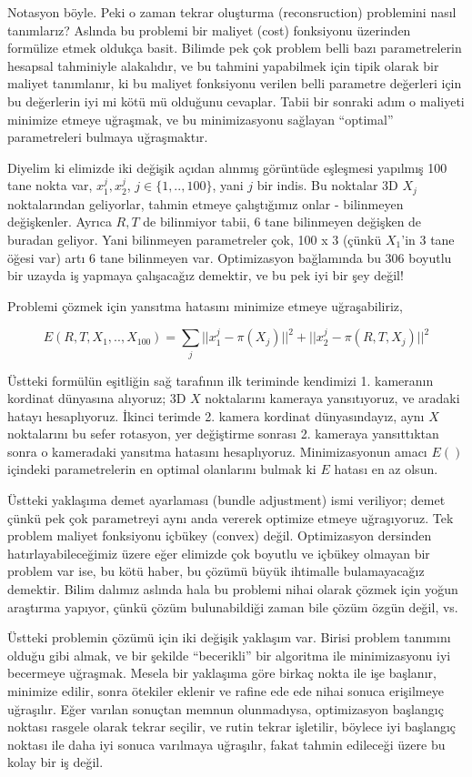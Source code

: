 \documentclass[12pt,fleqn]{article}\usepackage{../../common}
\begin{document}
Notasyon böyle. Peki o zaman tekrar oluşturma (reconsruction) problemini nasıl
tanımlarız? Aslında bu problemi bir maliyet (cost) fonksiyonu üzerinden
formülize etmek oldukça basit. Bilimde pek çok problem belli bazı parametrelerin
hesapsal tahminiyle alakalıdır, ve bu tahmini yapabilmek için tipik olarak bir
maliyet tanımlanır, ki bu maliyet fonksiyonu verilen belli parametre değerleri
için bu değerlerin iyi mi kötü mü olduğunu cevaplar. Tabii bir sonraki adım o
maliyeti minimize etmeye uğraşmak, ve bu minimizasyonu sağlayan ``optimal''
parametreleri bulmaya uğraşmaktır.

Diyelim ki elimizde iki değişik açıdan alınmış görüntüde eşleşmesi yapılmış 100
tane nokta var, $x_1^j,x_2^j$, $j \in \{1,..,100\}$, yani $j$ bir indis. Bu
noktalar 3D $X_j$ noktalarından geliyorlar, tahmin etmeye çalıştığımız onlar -
bilinmeyen değişkenler. Ayrıca $R,T$ de bilinmiyor tabii, 6 tane bilinmeyen
değişken de buradan geliyor. Yani bilinmeyen parametreler çok, 100 x 3 (çünkü
$X_1$'in 3 tane öğesi var) artı 6 tane bilinmeyen var. Optimizasyon bağlamında
bu 306 boyutlu bir uzayda iş yapmaya çalışacağız demektir, ve bu pek iyi bir şey
değil!

Problemi çözmek için yansıtma hatasını minimize etmeye uğraşabiliriz, 

$$ E(R,T,X_1,..,X_{100}) = 
\sum _{j} || x_1^j - \pi(X_j)||^2 + || x_2^j - \pi(R,T,X_j)||^2
$$

Üstteki formülün eşitliğin sağ tarafının ilk teriminde kendimizi 1. kameranın
kordinat dünyasına alıyoruz; 3D $X$ noktalarını kameraya yansıtıyoruz, ve
aradaki hatayı hesaplıyoruz. İkinci terimde 2. kamera kordinat dünyasındayız,
aynı $X$ noktalarını bu sefer rotasyon, yer değiştirme sonrası 2. kameraya
yansıttıktan sonra o kameradaki yansıtma hatasını hesaplıyoruz. Minimizasyonun
amacı $E()$ içindeki parametrelerin en optimal olanlarını bulmak ki $E$ hatası
en az olsun.

Üstteki yaklaşıma demet ayarlaması (bundle adjustment) ismi veriliyor; demet
çünkü pek çok parametreyi aynı anda vererek optimize etmeye uğraşıyoruz. Tek
problem maliyet fonksiyonu içbükey (convex) değil. Optimizasyon dersinden
hatırlayabileceğimiz üzere eğer elimizde çok boyutlu ve içbükey olmayan bir
problem var ise, bu kötü haber, bu çözümü büyük ihtimalle bulamayacağız
demektir. Bilim dalımız aslında hala bu problemi nihai olarak çözmek için yoğun
araştırma yapıyor, çünkü çözüm bulunabildiği zaman bile çözüm özgün değil, vs.

Üstteki problemin çözümü için iki değişik yaklaşım var. Birisi problem tanımını
olduğu gibi almak, ve bir şekilde ``becerikli'' bir algoritma ile minimizasyonu
iyi becermeye uğraşmak. Mesela bir yaklaşıma göre birkaç nokta ile işe başlanır,
minimize edilir, sonra ötekiler eklenir ve rafine ede ede nihai sonuca
erişilmeye uğraşılır. Eğer varılan sonuçtan memnun olunmadıysa, optimizasyon
başlangıç noktası rasgele olarak tekrar seçilir, ve rutin tekrar işletilir,
böylece iyi başlangıç noktası ile daha iyi sonuca varılmaya uğraşılır, fakat
tahmin edileceği üzere bu kolay bir iş değil.
\end{document}
